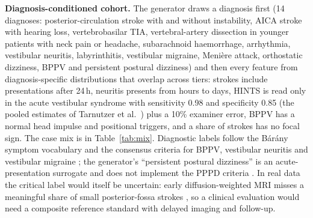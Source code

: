 \documentclass[11pt,a4paper]{article}%
\begin{document}
\textbf{Diagnosis-conditioned cohort.} The generator draws a diagnosis first (14 diagnoses: posterior-circulation stroke with and without instability, AICA stroke with hearing loss, vertebrobasilar TIA, vertebral-artery dissection in younger patients with neck pain or headache, subarachnoid haemorrhage, arrhythmia, vestibular neuritis, labyrinthitis, vestibular migraine, Meni\`ere attack, orthostatic dizziness, BPPV and persistent postural dizziness) and then every feature from diagnosis-specific distributions that overlap across tiers: strokes include presentations after 24\,h, neuritis presents from hours to days, HINTS is read only in the acute vestibular syndrome with sensitivity 0.98 and specificity 0.85 (the pooled estimates of Tarnutzer et al.\ \cite{tarnutzer2011bedside}) plus a 10\% examiner error, BPPV has a normal head impulse and positional triggers, and a share of strokes has no focal sign. The case mix is in Table~\ref{tab:mix}. Diagnostic labels follow the B\'ar\'any symptom vocabulary \cite{bisdorff2009classification} and the consensus criteria for BPPV, vestibular neuritis and vestibular migraine \cite{vonbrevern2015bppv,bhattacharyya2017bppv,strupp2022neuritis,lempert2021vm}; the generator's ``persistent postural dizziness'' is an acute-presentation surrogate and does not implement the PPPD criteria \cite{staab2017pppd}. In real data the critical label would itself be uncertain: early diffusion-weighted MRI misses a meaningful share of small posterior-fossa strokes \cite{sabertehrani2014small,shah2022neuroimaging}, so a clinical evaluation would need a composite reference standard with delayed imaging and follow-up.
\end{document}
